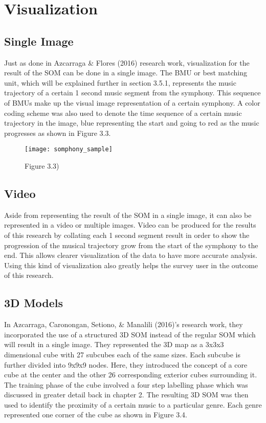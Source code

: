 \section{Visualization}
\subsection{Single Image}

Just as done in Azcarraga \& Flores (2016) research work, visualization for the result of the SOM can be done in a single image. The BMU or best matching unit, which will be explained further in section 3.5.1, represents the music trajectory of a certain 1 second music segment from the symphony. This sequence of BMUs make up the visual image representation of a certain symphony. A color coding scheme was also used to denote the time sequence of a certain music trajectory in the image, blue representing the start and going to red as the music progresses as shown in Figure 3.3.

\begin{figure}[h]
\caption{Figure 3.3)}
\centering
\texttt{[image: somphony\_sample]}
\end{figure}

\subsection{Video}
Aside from representing the result of the SOM in a single image, it can also be represented in a video or multiple images. Video can be produced for the results of this research by collating  each 1 second segment result in order to show the progression of the musical trajectory grow from the start of the symphony to the end. This allows clearer visualization of the data to have more accurate analysis. Using this kind of visualization also greatly helps the survey user in the outcome of this research.

\subsection{3D Models}

In Azcarraga, Caronongan,  Setiono, \& Manalili (2016)’s research work, they incorporated the use of a structured 3D SOM instead of the regular SOM which will result in a single image. They represented the 3D map as a 3x3x3 dimensional cube with 27 subcubes each of the same sizes. Each subcube is further divided into 9x9x9 nodes. Here, they introduced the concept of a core cube at the center and the other 26 corresponding exterior cubes surrounding it. The training phase of the cube involved a four step labelling phase which was discussed in greater detail back in chapter 2. The resulting 3D SOM was then used to identify the proximity of a certain music to a particular genre. Each genre represented one corner of the cube as shown in Figure 3.4.

